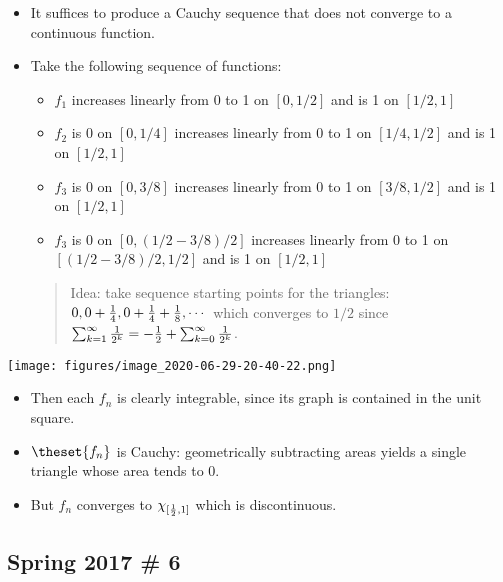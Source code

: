 \begin{solution}
\begin{itemize}
\item
  It suffices to produce a Cauchy sequence that does not converge to a
  continuous function.
\item
  Take the following sequence of functions:

  \begin{itemize}
  \tightlist
  \item
    \(f_1\) increases linearly from 0 to 1 on \([0, 1/2]\) and is 1 on
    \([1/2, 1]\)
  \item
    \(f_2\) is 0 on \([0, 1/4]\) increases linearly from 0 to 1 on
    \([1/4, 1/2]\) and is 1 on \([1/2, 1]\)
  \item
    \(f_3\) is 0 on \([0, 3/8]\) increases linearly from 0 to 1 on
    \([3/8, 1/2]\) and is 1 on \([1/2, 1]\)
  \item
    \(f_3\) is 0 on \([0, (1/2 - 3/8)/2]\) increases linearly from 0 to
    1 on \([(1/2 - 3/8)/2, 1/2]\) and is 1 on \([1/2, 1]\)
  \end{itemize}

  \begin{quote}
  Idea: take sequence starting points for the triangles:
  \(0, 0 + {1\over 4}, 0 + {1 \over 4} + {1\over 8}, \cdots\) which
  converges to \(1/2\) since
  \(\sum_{k=1}^\infty{1\over 2^k} = -{1\over 2} + \sum_{k=0}^\infty {1\over 2^k}\).
  \end{quote}
\end{itemize}

\texttt{[image: figures/image\_2020-06-29-20-40-22.png]}

\begin{itemize}
\tightlist
\item
  Then each \(f_n\) is clearly integrable, since its graph is contained
  in the unit square.
\item
  \(\theset{f_n}\) is Cauchy: geometrically subtracting areas yields a
  single triangle whose area tends to 0.
\item
  But \(f_n\) converges to \(\chi_{[{1\over 2}, 1]}\) which is
  discontinuous.
\end{itemize}


\end{solution}

\hypertarget{spring-2017-6}{%
\subsection{Spring 2017 \# 6}\label{spring-2017-6}}

